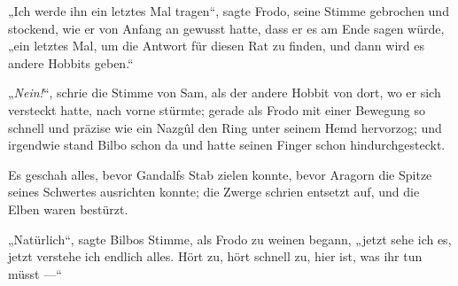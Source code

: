 „Ich werde ihn ein letztes Mal tragen“, sagte Frodo, seine Stimme gebrochen und stockend, wie er von Anfang an gewusst hatte, dass er es am Ende sagen würde, „ein letztes Mal, um die Antwort für diesen Rat zu finden, und dann wird es andere Hobbits geben.“

„\emph{Nein!}“, schrie die Stimme von Sam, als der andere Hobbit von dort, wo er sich versteckt hatte, nach vorne stürmte; gerade als Frodo mit einer Bewegung so schnell und präzise wie ein Nazgûl den Ring unter seinem Hemd hervorzog; und irgendwie stand Bilbo schon da und hatte seinen Finger schon hindurchgesteckt.

Es geschah alles, bevor Gandalfs Stab zielen konnte, bevor Aragorn die Spitze seines Schwertes ausrichten konnte; die Zwerge schrien entsetzt auf, und die Elben waren bestürzt.

„Natürlich“, sagte Bilbos Stimme, als Frodo zu weinen begann, „jetzt sehe ich es, jetzt verstehe ich endlich alles. Hört zu, hört schnell zu, hier ist, was ihr tun müsst —“

